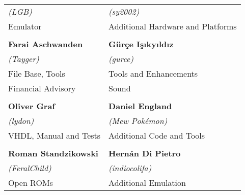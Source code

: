 \begin{tabular}{ll}
 \textit{(LGB)}                         & \textit{(sy2002)} \\
Emulator                                & Additional Hardware and Platforms \\
& \\
{\large\bf Farai Aschwanden}            & {\large\bf Gürçe Işıkyıldız} \\
 \textit{(Tayger)}                      & \textit{(gurce)} \\
File Base, Tools                        & Tools and Enhancements \\
Financial Advisory                      & Sound            \\
& \\
{\large\bf Oliver Graf}                 & {\large\bf Daniel England} \\
 \textit{(lydon)}                       & \textit{(Mew Pokémon)} \\
VHDL, Manual and Tests                  & Additional Code and Tools \\
& \\
{\large\bf Roman Standzikowski}         & {\large\bf Hernán Di Pietro} \\
 \textit{(FeralChild)}                  & \textit{(indiocolifa)} \\
Open ROMs                               & Additional Emulation \\
\end{tabular}

